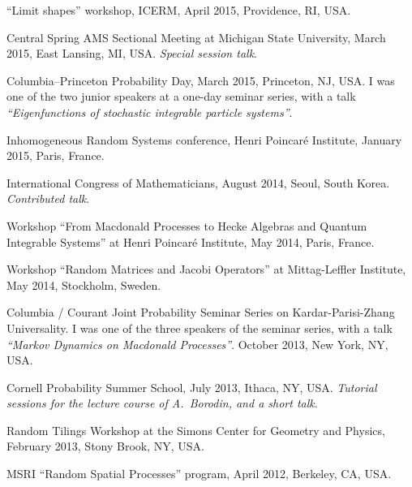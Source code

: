 \documentclass[letterpaper,11pt]{article}
\begin{document}
\begin{etaremune}
\item ``Limit shapes'' workshop, ICERM, April 2015, Providence, RI, USA. 

\item Central Spring AMS Sectional Meeting at Michigan State University, March 2015, East Lansing, MI, USA. \emph{Special session talk}.

\item Columbia--Princeton Probability Day, March 2015, Princeton, NJ, USA.
I was one of the two junior speakers at a one-day seminar series,
with a talk \emph{``Eigenfunctions of stochastic integrable particle systems''}.

\item Inhomogeneous Random Systems conference, Henri Poincar\'e Institute, January 2015, Paris, France.

\item International Congress of Mathematicians, August 2014, 
Seoul, South Korea. \emph{Contributed talk}.

\item Workshop 
``From Macdonald Processes to Hecke Algebras and Quantum Integrable Systems''
at Henri Poincar\'e Institute,
May 2014, Paris, France.

\item 
Workshop
``Random Matrices and Jacobi Operators''
at 
Mittag-Leffler Institute,
May 2014, Stockholm, Sweden.

\item
Columbia / Courant Joint Probability Seminar Series on Kardar-Parisi-Zhang Universality. 
I was one of the three speakers of the seminar series,
with a talk
\emph{``Markov Dynamics on Macdonald Processes''}.
October 2013, New York, NY, USA.

\item
Cornell Probability Summer School, July 2013, Ithaca, NY, USA.
\emph{Tutorial sessions for the lecture course of 
A.~Borodin, and a short talk}.

\item 
Random Tilings Workshop at the 
Simons Center for Geometry and Physics,
February 2013, Stony Brook, NY, USA.

\item  
MSRI ``Random Spatial Processes'' program,
April 2012, Berkeley, CA, USA.



\end{etaremune}
\end{document}
